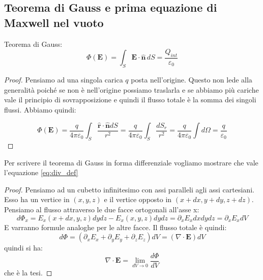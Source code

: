 \documentclass{article}
\renewcommand{\epsilon}{\varepsilon}
\newcommand{\mbf}{\mathbf}
\newcommand{\vers}[1]{\mbf{\hat #1 }}
\numberwithin{equation}{section}
\begin{document}

\subsection{Teorema di Gauss e prima equazione di Maxwell nel vuoto} %
\label{sub:teorema_di_gauss_e_prima_equazione_di_maxwell}


Teorema di Gauss:
\begin{equation} \label{eq:gauss_int} 
    \Phi ( \mbf E ) = \int_S \mbf{ E \cdot \hat n} \, dS = \frac{ Q_{int} }{ \epsilon_0 } 
\end{equation}

\begin{proof}
    Pensiamo ad una singola carica $q$ posta nell'origine. Questo non lede alla generalità poiché se non è nell'origine possiamo traslarla e se abbiamo più cariche vale il principio di sovrapposizione e quindi il flusso totale è la somma dei singoli flussi. Abbiamo quindi:

    \begin{equation*}
        \Phi ( \mbf E ) = \frac{q}{4 \pi \epsilon_0 } \int_S \frac{ \vers r  \cdot \vers n dS }{ r^2 }
                        = \frac{q}{4 \pi \epsilon_0 } \int_S \frac{ dS_r }{ r^2 } 
                        = \frac{q}{4 \pi \epsilon_0 } \int d\Omega
                        = \frac{q}{\epsilon_0 }
    \end{equation*}

\end{proof}

Per scrivere il teorema di Gauss in forma differenziale vogliamo mostrare che vale l'equazione \ref{eq:div_def}
\begin{proof}
    Pensiamo ad un cubetto infinitesimo con assi paralleli agli assi cartesiani. Esso ha un vertice in $(x, y, z)$ e il vertice opposto in $(x + dx, y + dy, z + dz)$. Pensiamo al flusso attraverso le due facce ortogonali all'asse x:
    \begin{equation*}
        d\Phi_x = E_x(x + dx, y, z) dydz - E_x(x, y, z) dydz = \partial_x E_x dxdydz = \partial_x E_x dV
    \end{equation*}
    E varranno formule analoghe per le altre facce. Il flusso totale è quindi:
    \begin{equation*}
        d\Phi = (\partial_x E_x + \partial_y E_y + \partial_z E_z) dV = (\nabla \cdot \mbf E ) dV
    \end{equation*}
    quindi si ha:
    \begin{equation*}
        \nabla \cdot \mbf E 
        = \lim_{ dV \to 0 } \frac{ d\Phi }{ dV }
    \end{equation*}
    che è la tesi.
\end{proof}
\end{document}
